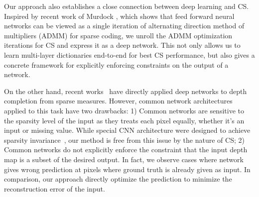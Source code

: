 Our approach also establishes a close connection between deep learning and CS. Inspired by recent work of Murdock \etal, which shows that feed forward neural networks can be viewed as a single iteration of alternating direction method of multipliers (ADMM) for sparse coding, we unroll the ADMM optimization iterations for CS and express it as a deep network. This not only allows us to learn multi-layer dictionaries end-to-end for best CS performance, but also gives a concrete framework for explicitly enforcing constraints on the output of a network.



On the other hand, recent works~\cite{} have directly applied deep networks to depth completion from sparse measures. However, common network architectures applied to this task have two drawbacks: 1) Common networks are sensitive to the sparsity level of the input as they treats each pixel equally, whether it's an input or missing value. While special CNN architecture were designed to achieve sparsity invariance~\cite{}, our method is free from this issue by the nature of CS; 2) Common networks do not explicitly enforce the constraint that the input depth map is a subset of the desired output. In fact, we observe cases where network gives wrong prediction at pixels where ground truth is already given as input. In comparison, our approach directly optimize the prediction to minimize the reconstruction error of the input.



  
